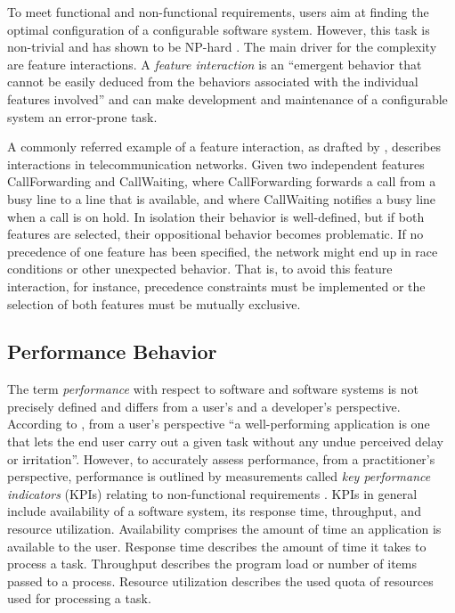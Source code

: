 To meet functional and non-functional requirements, users aim at finding the
optimal configuration of a configurable software system. However, this task is
non-trivial and has shown to be NP-hard \citep{white_selecting_2009}. The main
driver for the complexity are feature interactions. A \emph{feature
interaction} is an ``emergent behavior that cannot be easily deduced from the
behaviors associated with the individual features involved''
\citep{apel_feature-oriented_2013} and can make development and maintenance of
a configurable system an error-prone task.

{\color{red}
A commonly referred example of a feature interaction, as drafted by
\cite{calder_feature_2003}, describes interactions in telecommunication networks. 
Given two independent features \textsf{CallForwarding} and
\textsf{CallWaiting}, where \textsf{CallForwarding} forwards a call from a busy
line to a line that is available, and where \textsf{CallWaiting} notifies a
busy line when a call is on hold. In isolation their behavior is well-defined,
but if both features are selected, their oppositional behavior becomes
problematic. If no precedence of one feature has been specified, the network
might end up in race conditions or other unexpected behavior. That is, to avoid
this feature interaction, for instance, precedence constraints must be
implemented or the selection of both features must be mutually exclusive.}

\subsection{Performance Behavior}
The term \emph{performance} with respect to software and software systems is not
precisely defined and differs from a user's and a developer’s perspective.
According to \cite{molyneaux_art_2014}, from a user’s perspective ``a well-performing
application is one that lets the end user carry out a given task without any
undue perceived delay or irritation''. However, to accurately assess
performance, from a practitioner’s perspective, performance is outlined by
measurements called \emph{key performance indicators} (KPIs) relating to
non-functional requirements \citep{molyneaux_art_2014}. KPIs in general include
availability of a software system, its response time, throughput, and resource
utilization. Availability comprises the amount of time an application is
available to the user. Response time describes the amount of time it takes to
process a task. Throughput describes the program load or number of items passed
to a process. Resource utilization describes the used quota of resources used
for processing a task.

